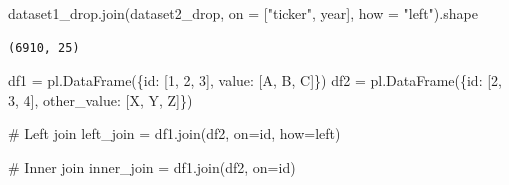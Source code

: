 \documentclass[
  letterpaper,
  DIV=11,
  numbers=noendperiod]{scrreprt}
\newenvironment{Shaded}{\begin{snugshade}}{\end{snugshade}}
\newcommand{\CommentTok}[1]{\textcolor[rgb]{0.37,0.37,0.37}{#1}}
\newcommand{\DecValTok}[1]{\textcolor[rgb]{0.68,0.00,0.00}{#1}}
\newcommand{\NormalTok}[1]{\textcolor[rgb]{0.00,0.23,0.31}{#1}}
\newcommand{\OperatorTok}[1]{\textcolor[rgb]{0.37,0.37,0.37}{#1}}
\newcommand{\StringTok}[1]{\textcolor[rgb]{0.13,0.47,0.30}{#1}}
\begin{document}
\begin{Shaded}
\begin{Highlighting}[]
\NormalTok{dataset1\_drop.join(dataset2\_drop, on }\OperatorTok{=}\NormalTok{ [}\StringTok{"ticker"}\NormalTok{, }\StringTok{\textquotesingle{}year\textquotesingle{}}\NormalTok{], how }\OperatorTok{=} \StringTok{"left"}\NormalTok{).shape}
\end{Highlighting}
\end{Shaded}

\begin{verbatim}
(6910, 25)
\end{verbatim}

\begin{Shaded}
\begin{Highlighting}[]
\NormalTok{df1 }\OperatorTok{=}\NormalTok{ pl.DataFrame(\{}\StringTok{\textquotesingle{}id\textquotesingle{}}\NormalTok{: [}\DecValTok{1}\NormalTok{, }\DecValTok{2}\NormalTok{, }\DecValTok{3}\NormalTok{], }\StringTok{\textquotesingle{}value\textquotesingle{}}\NormalTok{: [}\StringTok{\textquotesingle{}A\textquotesingle{}}\NormalTok{, }\StringTok{\textquotesingle{}B\textquotesingle{}}\NormalTok{, }\StringTok{\textquotesingle{}C\textquotesingle{}}\NormalTok{]\})}
\NormalTok{df2 }\OperatorTok{=}\NormalTok{ pl.DataFrame(\{}\StringTok{\textquotesingle{}id\textquotesingle{}}\NormalTok{: [}\DecValTok{2}\NormalTok{, }\DecValTok{3}\NormalTok{, }\DecValTok{4}\NormalTok{], }\StringTok{\textquotesingle{}other\_value\textquotesingle{}}\NormalTok{: [}\StringTok{\textquotesingle{}X\textquotesingle{}}\NormalTok{, }\StringTok{\textquotesingle{}Y\textquotesingle{}}\NormalTok{, }\StringTok{\textquotesingle{}Z\textquotesingle{}}\NormalTok{]\})}
\end{Highlighting}
\end{Shaded}

\begin{Shaded}
\begin{Highlighting}[]
\CommentTok{\# Left join}
\NormalTok{left\_join }\OperatorTok{=}\NormalTok{ df1.join(df2, on}\OperatorTok{=}\StringTok{\textquotesingle{}id\textquotesingle{}}\NormalTok{, how}\OperatorTok{=}\StringTok{\textquotesingle{}left\textquotesingle{}}\NormalTok{)}
\end{Highlighting}
\end{Shaded}

\begin{Shaded}
\begin{Highlighting}[]
\CommentTok{\# Inner join}
\NormalTok{inner\_join }\OperatorTok{=}\NormalTok{ df1.join(df2, on}\OperatorTok{=}\StringTok{\textquotesingle{}id\textquotesingle{}}\NormalTok{)}
\end{Highlighting}
\end{Shaded}
\end{document}
